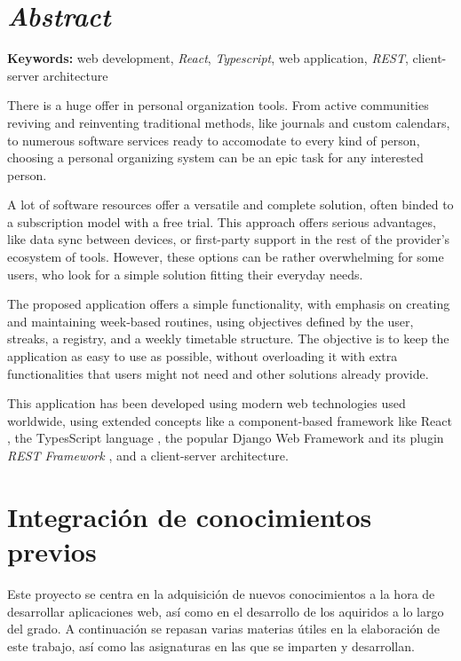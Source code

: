 \documentclass[10pt, a4paper]{aqademic}
\begin{document}
\newpage


\section{\textit{Abstract}}

\textbf{Keywords:} web development, \textit{React}, \textit{Typescript}, web application, \textit{REST}, client-server architecture

\bigskip

There is a huge offer in personal organization tools. From active communities reviving and reinventing traditional methods, like journals and custom calendars, 
to numerous software services ready to accomodate to every kind of person, choosing a personal organizing system can be an epic task for any interested person.

\medskip

A lot of software resources offer a versatile and complete solution, often binded to a subscription model with a free trial. This approach offers serious advantages, like data sync between devices, or first-party support in the rest of the provider's ecosystem of tools. However, these options can be rather overwhelming for some users, who look for a simple solution fitting their everyday needs.

\medskip

The proposed application offers a simple functionality, with emphasis on creating and maintaining week-based routines, using objectives defined by the user, streaks, a registry, and a weekly timetable structure. The objective is to keep the application as easy to use as possible, without overloading it with extra functionalities that users might not need and other solutions already provide. 

\medskip

This application has been developed using modern web technologies used worldwide, using extended concepts like a component-based framework like React \cite{react},
the TypesScript language \cite{bierman2014understanding}, the popular Django Web Framework \cite{django} and its plugin \textit{REST Framework} \cite{drf}, and a client-server architecture.


\newpage

\section{Integración de conocimientos previos}

Este proyecto se centra en la adquisición de nuevos conocimientos a la hora de desarrollar aplicaciones web, así como en el desarrollo de los aquiridos a lo largo del grado. A continuación se repasan varias materias útiles en la elaboración de este trabajo, así como las asignaturas en las que se imparten y desarrollan.
\end{document}
